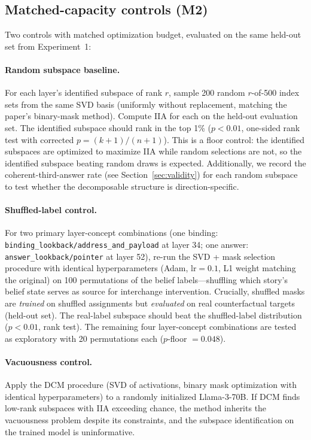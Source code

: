 \documentclass{article}
\begin{document}
\subsection{Matched-capacity controls (M2)}

Two controls with matched optimization budget, evaluated on the same held-out set from Experiment~1:

\paragraph{Random subspace baseline.} For each layer's identified subspace of rank $r$, sample 200 random $r$-of-500 index sets from the same SVD basis (uniformly without replacement, matching the paper's binary-mask method). Compute IIA for each on the held-out evaluation set. The identified subspace should rank in the top 1\% ($p < 0.01$, one-sided rank test with corrected $p = (k + 1)/(n + 1)$). This is a floor control: the identified subspaces are optimized to maximize IIA while random selections are not, so the identified subspace beating random draws is expected. Additionally, we record the coherent-third-answer rate (see Section~\ref{sec:validity}) for each random subspace to test whether the decomposable structure is direction-specific.

\paragraph{Shuffled-label control.} For two primary layer-concept combinations (one binding: \texttt{binding\_lookback/address\_and\_payload} at layer 34; one answer: \texttt{answer\_lookback/pointer} at layer 52), re-run the SVD + mask selection procedure with identical hyperparameters (Adam, $\text{lr} = 0.1$, L1 weight matching the original) on 100 permutations of the belief labels---shuffling which story's belief state serves as source for interchange intervention. Crucially, shuffled masks are \emph{trained} on shuffled assignments but \emph{evaluated} on real counterfactual targets (held-out set). The real-label subspace should beat the shuffled-label distribution ($p < 0.01$, rank test). The remaining four layer-concept combinations are tested as exploratory with 20 permutations each ($p$-floor $= 0.048$).

\paragraph{Vacuousness control.} Apply the DCM procedure (SVD of activations, binary mask optimization with identical hyperparameters) to a randomly initialized Llama-3-70B. If DCM finds low-rank subspaces with IIA exceeding chance, the method inherits the \citet{sutter2025vacuous} vacuousness problem despite its constraints, and the subspace identification on the trained model is uninformative.
\end{document}
